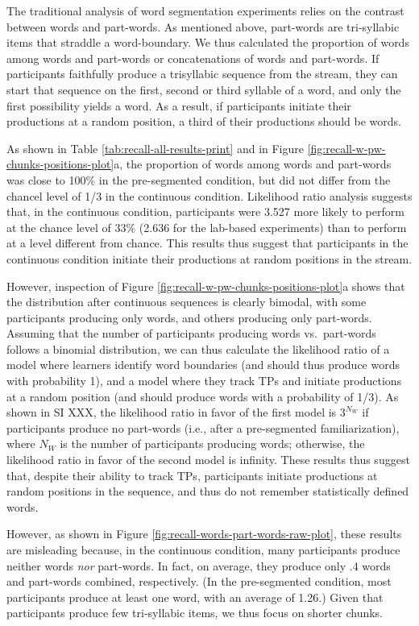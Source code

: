 \documentclass[
]{article}
\begin{document}
The traditional analysis of word segmentation experiments relies on the
contrast between words and part-words. As mentioned above, part-words
are tri-syllabic items that straddle a word-boundary. We thus calculated
the proportion of words among words and part-words or concatenations of
words and part-words. If participants faithfully produce a trisyllabic
sequence from the stream, they can start that sequence on the first,
second or third syllable of a word, and only the first possibility
yields a word. As a result, if participants initiate their productions
at a random position, a third of their productions should be words.

As shown in Table \ref{tab:recall-all-results-print} and in Figure
\ref{fig:recall-w-pw-chunks-positions-plot}a, the proportion of words
among words and part-words was close to 100\% in the pre-segmented
condition, but did not differ from the chancel level of 1/3 in the
continuous condition. Likelihood ratio analysis suggests that, in the
continuous condition, participants were 3.527 more likely to perform at
the chance level of 33\% (2.636 for the lab-based experiments) than to
perform at a level different from chance. This results thus suggest that
participants in the continuous condition initiate their productions at
random positions in the stream.

However, inspection of Figure
\ref{fig:recall-w-pw-chunks-positions-plot}a shows that the distribution
after continuous sequences is clearly bimodal, with some participants
producing only words, and others producing only part-words. Assuming
that the number of participants producing words vs.~part-words follows a
binomial distribution, we can thus calculate the likelihood ratio of a
model where learners identify word boundaries (and should thus produce
words with probability 1), and a model where they track TPs and initiate
productions at a random position (and should produce words with a
probability of 1/3). As shown in SI XXX, the likelihood ratio in favor
of the first model is \(3^{N_W}\) if participants produce no part-words
(i.e., after a pre-segmented familiarization), where \(N_W\) is the
number of participants producing words; otherwise, the likelihood ratio
in favor of the second model is infinity. These results thus suggest
that, despite their ability to track TPs, participants initiate
productions at random positions in the sequence, and thus do not
remember statistically defined words.

However, as shown in Figure \ref{fig:recall-words-part-words-raw-plot},
these results are misleading because, in the continuous condition, many
participants produce neither words \emph{nor} part-words. In fact, on
average, they produce only .4 words and part-words combined,
respectively. (In the pre-segmented condition, most participants produce
at least one word, with an average of 1.26.) Given that participants
produce few tri-syllabic items, we thus focus on shorter chunks.
\end{document}
